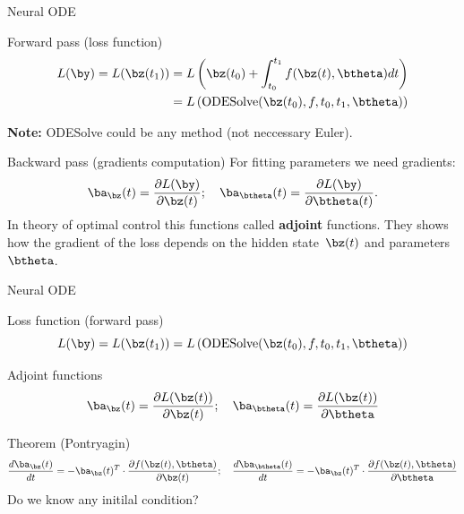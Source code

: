\begin{frame}{Neural ODE}
	\begin{block}{Forward pass (loss function)}
		\vspace{-0.5cm}
		\begin{align*}
			L(\by) = L(\bz(t_1)) &= L\left( \bz(t_0) + \int_{t_0}^{t_1} f(\bz(t), \btheta) dt \right) \\ &= L\left(\text{ODESolve}(\bz(t_0), f, t_0,t_1, \btheta) \right)
		\end{align*}
	\vspace{-0.5cm}
	\end{block}
	\textbf{Note:} ODESolve could be any method (not neccessary Euler).
	\begin{block}{Backward pass (gradients computation)}
		For fitting parameters we need gradients:
		\[
		\ba_{\bz}(t) = \frac{\partial L(\by)}{\partial \bz(t)}; \quad \ba_{\btheta}(t) = \frac{\partial L(\by)}{\partial \btheta(t)}.
		\]
		In theory of optimal control this functions called \textbf{adjoint} functions. 
		They shows how the gradient of the loss depends on the hidden state~$\bz(t)$ and parameters $\btheta$.
	\end{block}

\end{frame}
\begin{frame}{Neural ODE}
	\begin{block}{Loss function (forward pass)}
	\vspace{-0.2cm}
	\[
	    L(\by) = L(\bz(t_1)) = L\left(\text{ODESolve}(\bz(t_0), f, t_0,t_1, \btheta) \right)
	\]
	\vspace{-0.3cm}
	\end{block}
	\begin{block}{Adjoint functions}
	\vspace{-0.2cm}
	\[
	    \ba_{\bz}(t) = \frac{\partial L(\bz(t))}{\partial \bz(t)}; \quad \ba_{\btheta}(t) = \frac{\partial L(\bz(t))}{\partial \btheta}
	\]
	\vspace{-0.2cm}
	\end{block}
	\begin{block}{Theorem (Pontryagin)}
	\vspace{-0.3cm}
	\[
	    \frac{d \ba_{\bz}(t)}{dt} = - \ba_{\bz}(t)^T \cdot \frac{\partial f(\bz(t), \btheta)}{\partial \bz(t)}; \quad  \frac{d \ba_{\btheta}(t)}{dt} = - \ba_{\bz}(t)^T \cdot \frac{\partial f(\bz(t), \btheta)}{\partial \btheta}
	\]
	Do we know any initilal condition?
	\end{block}

\end{frame}
